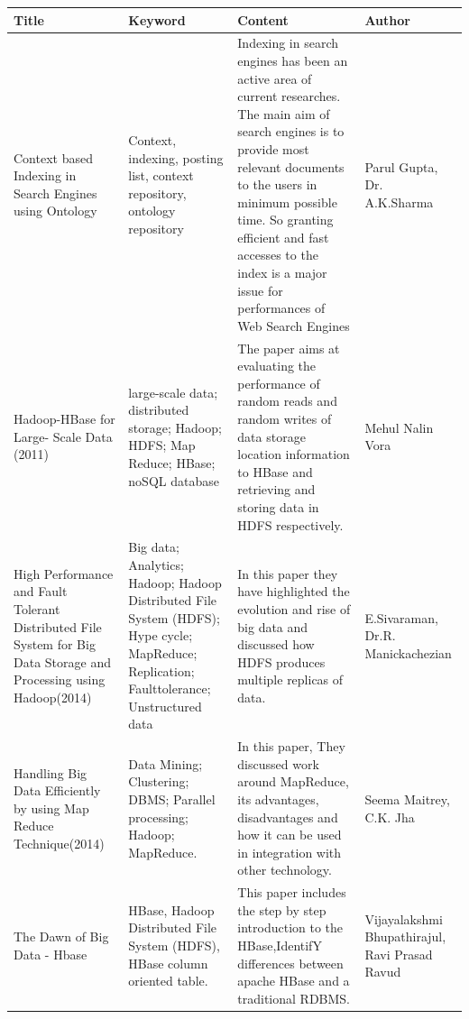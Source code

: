 \documentclass[oneside,a4paper,12pt]{report}
\begin{document}
{\tabulinesep=2mm
   \begin{longtabu} { |p{3.5cm} | p{3.5cm} | p{4cm }| p{2.5cm }|}
       \hline

\textbf{Title} & \textbf{Keyword} & \textbf{Content} & \textbf{Author}\\ \hline
Context based Indexing in Search Engines using Ontology &
Context, indexing, posting list, context repository, ontology repository &
Indexing in search engines has been an active area of current researches. The main aim of search engines is to provide most relevant documents to the users in minimum possible time. So granting efficient and fast accesses to the index is a major issue for performances of Web Search Engines &
Parul Gupta, Dr. A.K.Sharma \\ \hline

Hadoop-HBase for Large- Scale  Data (2011) &
large-scale  data;  distributed  storage;  Hadoop; HDFS; Map Reduce; HBase; noSQL database &
The  paper  aims  at evaluating the performance of random reads and random writes of data storage location information to HBase and retrieving and storing  data  in  HDFS  respectively. &
Mehul Nalin Vora \\ \hline

High Performance and Fault Tolerant Distributed File System for Big Data Storage and Processing using Hadoop(2014) &
Big data; Analytics; Hadoop; Hadoop Distributed File System (HDFS); Hype cycle; MapReduce; Replication; Faulttolerance; Unstructured data &
In this paper they have highlighted the evolution and rise of big data  and discussed how HDFS produces multiple replicas of data. &
E.Sivaraman, Dr.R. Manickachezian \\ \hline

Handling Big Data Efficiently by using Map Reduce Technique(2014) &
Data Mining; Clustering; DBMS; Parallel processing; Hadoop; MapReduce. &
 In this paper, They discussed work around MapReduce, its advantages, disadvantages and how it can be used in integration with other technology. &
Seema Maitrey, C.K. Jha \\ \hline

The Dawn of Big Data - Hbase &
HBase, Hadoop Distributed File System (HDFS), HBase column oriented table. &
This paper includes the step by step introduction to the HBase,IdentifY differences between apache HBase and a traditional RDBMS. &
Vijayalakshmi Bhupathirajul, Ravi Prasad Ravud \\ \hline
      
   \end{longtabu}
}
\end{document}
